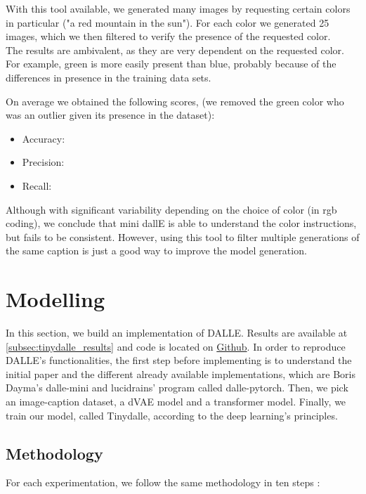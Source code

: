 \documentclass{article}
\begin{document}
With this tool available, we generated many images by requesting certain colors in particular ("a red mountain in the sun"). For each color we generated 25 images, which we then filtered to verify the presence of the requested color.\\

The results are ambivalent, as they are very dependent on the requested color. For example, green is more easily present than blue, probably because of the differences in presence in the training data sets.

On average we obtained the following scores, (we removed the green color who was an outlier given its presence in the dataset): 
\begin{itemize}
    \item Accuracy: 
    \item Precision: 
    \item Recall: 
\end{itemize}

Although with significant variability depending on the choice of color (in rgb coding), we conclude that mini dallE is able to understand the color instructions, but fails to be consistent. However, using this tool to filter multiple generations of the same caption is just a good way to improve the model generation.




\pagebreak

\section{Modelling}

In this section, we build an implementation of DALLE. Results are available at \ref{subsec:tinydalle_results} and code is located on \href{https://github.com/cthiounn/dalle-tiny}{Github}. In order to reproduce DALLE's functionalities, the first step before implementing is to understand the initial paper and the different already available implementations, which are Boris Dayma's dalle-mini and lucidrains' program called dalle-pytorch. Then, we pick an image-caption dataset, a dVAE model and a transformer model. Finally, we train our model, called Tinydalle, according to the deep learning's principles.

\subsection{Methodology}

For each experimentation, we follow the same methodology in ten steps :
\end{document}
